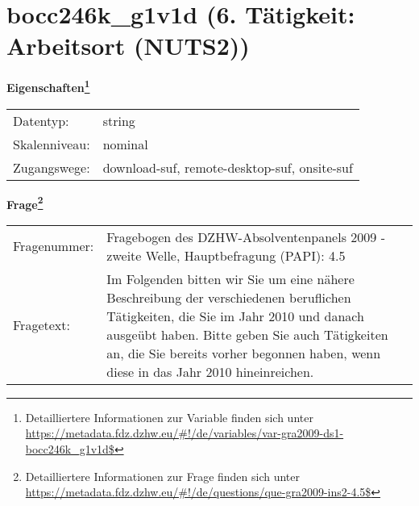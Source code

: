 
    \setcounter{footnote}{0}

    \vspace*{-1.8cm}
	\section{bocc246k\_g1v1d (6. Tätigkeit: Arbeitsort (NUTS2))}
	\label{section:bocc246k_g1v1d}



    \vspace*{0.5cm}
    \noindent\textbf{Eigenschaften\footnote{Detailliertere Informationen zur Variable finden sich unter
		\url{https://metadata.fdz.dzhw.eu/\#!/de/variables/var-gra2009-ds1-bocc246k_g1v1d$}}}\\
	\begin{tabularx}{\hsize}{@{}lX}
	Datentyp: & string \\
	Skalenniveau: & nominal \\
	Zugangswege: &
	  download-suf, 
	  remote-desktop-suf, 
	  onsite-suf
 \\
    \end{tabularx}



				\vspace*{0.5cm}
                \noindent\textbf{Frage\footnote{Detailliertere Informationen zur Frage finden sich unter
		              \url{https://metadata.fdz.dzhw.eu/\#!/de/questions/que-gra2009-ins2-4.5$}}}\\
				\begin{tabularx}{\hsize}{@{}lX}
					Fragenummer: &
					  Fragebogen des DZHW-Absolventenpanels 2009 - zweite Welle, Hauptbefragung (PAPI):
					  4.5
 \\
					Fragetext: & Im Folgenden bitten wir Sie um eine nähere Beschreibung der verschiedenen beruflichen Tätigkeiten, die Sie im Jahr 2010 und danach ausgeübt haben. Bitte geben Sie auch Tätigkeiten an, die Sie bereits vorher begonnen haben, wenn diese in das Jahr 2010 hineinreichen. \\
				\end{tabularx}





